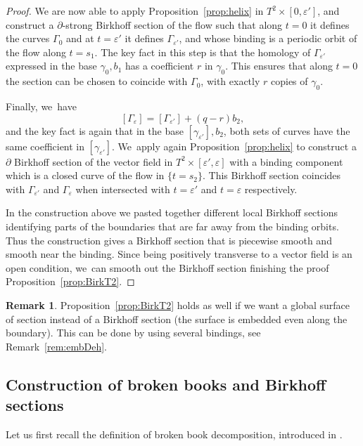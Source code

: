 \documentclass[JEP,XML,SOM,Unicode,NoEqCountersInSection,NoFloatCountersInSection,published]{cedram}
\theoremstyle{definition}
\newtheorem{Remark}[theorem]{Remark}
\begin{document}
\begin{proof}
We are now able to apply Proposition~\ref{prop:helix} in $T^2\times [0,\varepsilon']$, and construct a $\partial$-strong Birkhoff section of the flow such that along $t=0$ it defines the curves $\Gamma_0$ and at $t=\varepsilon'$ it defines $\Gamma_{\varepsilon'}$, and whose binding is a periodic orbit of the flow along $t=s_1$. The key fact in this step is that the homology of $\Gamma_{\varepsilon'}$ expressed in the base $\gamma_0, b_1$ has a coefficient $r$ in $\gamma_0$. This ensures that along $t=0$ the section can be chosen to coincide with $\Gamma_0$, \ie with exactly $r$ copies of $\gamma_0$.

Finally, we~have
\[
[\Gamma_\varepsilon]= [\Gamma_{\varepsilon'}]+ (q-r)b_2,
\]
and the key fact is again that in the base $[\gamma_{\varepsilon'}], b_2$, both sets of curves have the same coefficient in $[\gamma_{\varepsilon'}]$. We~apply again Proposition~\ref{prop:helix} to construct a $\partial$ Birkhoff section of the vector field in $T^2\times [\varepsilon',\varepsilon]$ with a binding component which is a closed curve of the flow in $\{t=s_2\}$. This Birkhoff section coincides with $\Gamma_{\varepsilon'}$ and $\Gamma_{\varepsilon}$ when intersected with $t=\varepsilon'$ and $t=\varepsilon$ respectively.

In the construction above we pasted together different local Birkhoff sections identifying parts of the boundaries that are far away from the binding orbits. Thus the construction gives a Birkhoff section that is piecewise smooth and smooth near the binding. Since being positively transverse to a vector field is an open condition, we~can smooth out the Birkhoff section finishing the proof Proposition~\ref{prop:BirkT2}.
\end{proof}

\begin{Remark}
Proposition~\ref{prop:BirkT2} holds as well if we want a global surface of section instead of a Birkhoff section (\ie the surface is embedded even along the boundary). This can be done by using several bindings, see Remark~\ref{rem:embDeh}.
\end{Remark}

\subsection{Construction of broken books and Birkhoff sections} \label{sec:bbook}

Let us first recall the definition of broken book decomposition, introduced in \cite{CDR}.
\end{document}
